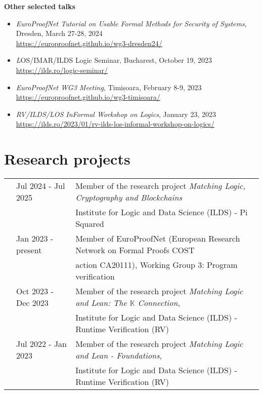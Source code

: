\documentclass[letterpaper,11pt,oneside]{article}
\begin{document}
\noindent
\large{\textbf{Other selected talks}} 
\normalsize
\begin{itemize}
    \item \emph{EuroProofNet Tutorial on Usable Formal Methods for Security of Systems}, \\
    Dresden, March 27-28, 2024 \\ 
    \url{https://europroofnet.github.io/wg3-dresden24/}
    \item {\emph LOS/IMAR/ILDS Logic Seminar}, Bucharest, October 19, 2023 \\  
    \url{https://ilds.ro/logic-seminar/}
    \item \emph{EuroProofNet WG3 Meeting}, Timișoara, February 8-9, 2023 \\ 
    \url{https://europroofnet.github.io/wg3-timisoara/} 
    \item \emph{RV/ILDS/LOS InFormal Workshop on Logics}, 
    January 23, 2023 \\
    \url{https://ilds.ro/2023/01/rv-ilds-los-informal-workshop-on-logics/}
\end{itemize}
\mbox{} 


\noindent
\section{Research projects}
\normalsize
\begin{tabular}{@{} l l l}
    & Jul 2024 - Jul 2025 & Member of the research project \emph{Matching Logic, Cryptography and Blockchains} \\ 
    &                    & Institute for Logic and Data Science (ILDS) - Pi Squared \\
    & Jan 2023 - present & Member of EuroProofNet (European Research Network on Formal Proofs COST \\
    &                & action CA20111), Working Group 3: Program verification \\
    & Oct 2023 - Dec 2023 & Member of the research project \emph{Matching Logic and Lean: The $\mathbb{K}$ Connection}, \\
    &                    & Institute for Logic and Data Science (ILDS) - Runtime Verification (RV) \\
    & Jul 2022 - Jan 2023 & Member of the research project \emph{Matching Logic and Lean - Foundations}, \\
    &                     & Institute for Logic and Data Science (ILDS) - Runtime Verification (RV)
\end{tabular}
\mbox{}
\end{document}

